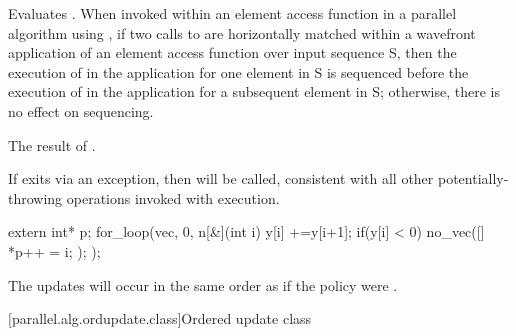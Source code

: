 \begin{itemdescr}
\pnum
\effects Evaluates . When invoked within an element access function in a parallel algorithm using , if two calls to  are horizontally matched within a wavefront application of an element access function over input sequence S, then the execution of  in the application for one element in S is sequenced before the execution of  in the application for a subsequent element in S; otherwise, there is no effect on sequencing.

\pnum
\returns The result of .

\pnum
\realnotes If  exits via an exception, then  will be called, consistent with all other potentially-throwing operations invoked with  execution.

\begin{example}
\begin{codeblock}
extern int* p;
for_loop(vec, 0, n[&](int i) {
  y[i] +=y[i+1];
  if(y[i] < 0) {
    no_vec([]{
      *p++ = i;
    });
  }
});
\end{codeblock}

The updates  will occur in the same order as if the policy were .
\end{example}

\end{itemdescr}

[parallel.alg.ordupdate.class]{Ordered update class}

